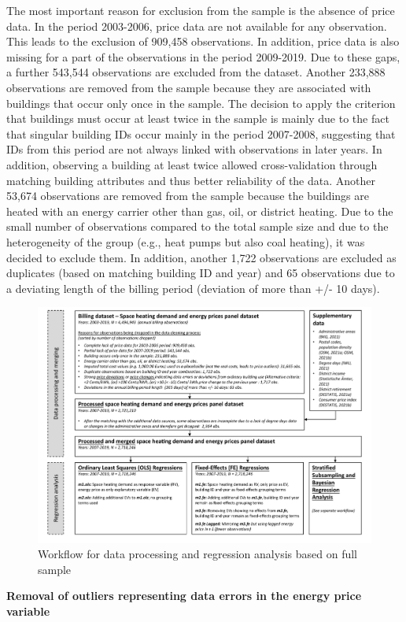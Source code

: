 \documentclass[12pt,twoside]{reedthesis}
\begin{document}
The most important reason for exclusion from the sample is the absence of price data. In the period 2003-2006, price data are not available for any observation. This leads to the exclusion of 909,458 observations. In addition, price data is also missing for a part of the observations in the period 2009-2019. Due to these gaps, a further 543,544 observations are excluded from the dataset. Another 233,888 observations are removed from the sample because they are associated with buildings that occur only once in the sample. The decision to apply the criterion that buildings must occur at least twice in the sample is mainly due to the fact that singular building IDs occur mainly in the period 2007-2008, suggesting that IDs from this period are not always linked with observations in later years. In addition, observing a building at least twice allowed cross-validation through matching building attributes and thus better reliability of the data. Another 53,674 observations are removed from the sample because the buildings are heated with an energy carrier other than gas, oil, or district heating. Due to the small number of observations compared to the total sample size and due to the heterogeneity of the group (e.g., heat pumps but also coal heating), it was decided to exclude them. In addition, another 1,722 observations are excluded as duplicates (based on matching building ID and year) and 65 observations due to a deviating length of the billing period (deviation of more than +/- 10 days).
\begin{figure}

{\centering \includegraphics[width=1.03\linewidth]{figure/workflow_diagramm_part1} 

}

\caption{Workflow for data processing and regression analysis based on full sample}\label{fig:workflow1}
\end{figure}
\textbf{Removal of outliers representing data errors in the energy price variable}
\end{document}
